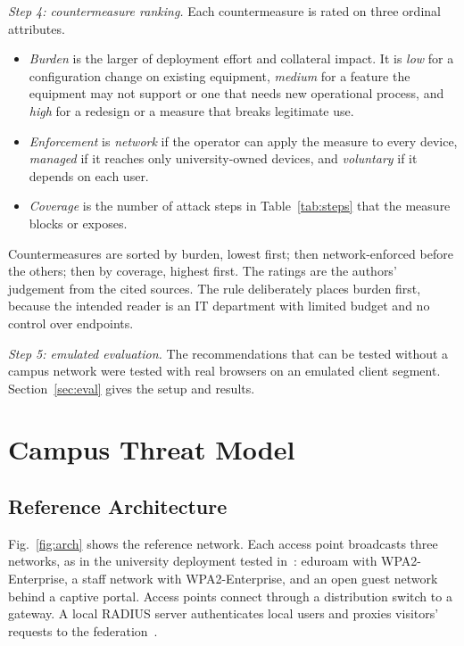 \documentclass[conference]{IEEEtran}
\begin{document}
\textit{Step 4: countermeasure ranking.} Each countermeasure is rated on three ordinal attributes.
\begin{itemize}
\item \textit{Burden} is the larger of deployment effort and collateral impact. It is \textit{low} for a configuration change on existing equipment, \textit{medium} for a feature the equipment may not support or one that needs new operational process, and \textit{high} for a redesign or a measure that breaks legitimate use.
\item \textit{Enforcement} is \textit{network} if the operator can apply the measure to every device, \textit{managed} if it reaches only university-owned devices, and \textit{voluntary} if it depends on each user.
\item \textit{Coverage} is the number of attack steps in Table~\ref{tab:steps} that the measure blocks or exposes.
\end{itemize}
Countermeasures are sorted by burden, lowest first; then network-enforced before the others; then by coverage, highest first. The ratings are the authors' judgement from the cited sources. The rule deliberately places burden first, because the intended reader is an IT department with limited budget and no control over endpoints.

\textit{Step 5: emulated evaluation.} The recommendations that can be tested without a campus network were tested with real browsers on an emulated client segment. Section~\ref{sec:eval} gives the setup and results.

\section{Campus Threat Model}
\label{sec:model}
\subsection{Reference Architecture}
Fig.~\ref{fig:arch} shows the reference network. Each access point broadcasts three networks, as in the university deployment tested in~\cite{airsnitch2026}: eduroam with WPA2-Enterprise, a staff network with WPA2-Enterprise, and an open guest network behind a captive portal. Access points connect through a distribution switch to a gateway. A local RADIUS server authenticates local users and proxies visitors' requests to the federation~\cite{rfc7593}.
\end{document}

